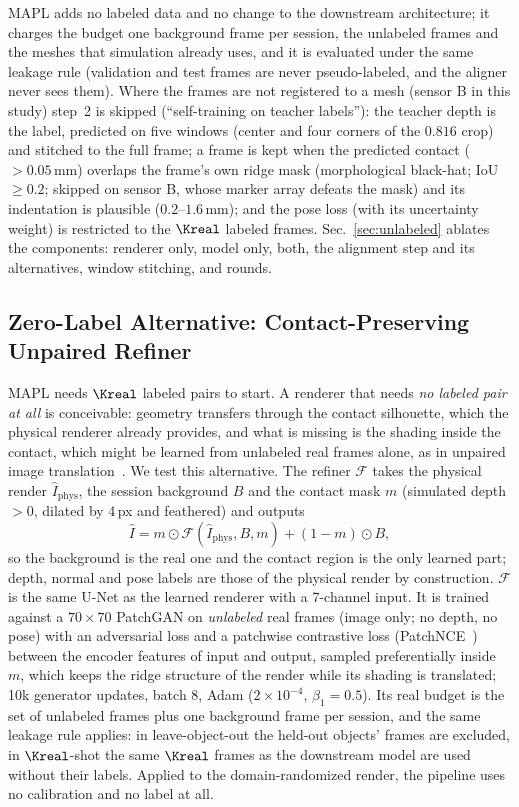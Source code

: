 MAPL adds no labeled data and no change to the downstream architecture; it charges the budget one background frame per session, the unlabeled frames and the meshes that simulation already uses, and it is evaluated under the same leakage rule (validation and test frames are never pseudo-labeled, and the aligner never sees them). Where the frames are not registered to a mesh (sensor B in this study) step~2 is skipped (``self-training on teacher labels''): the teacher depth is the label, predicted on five windows (center and four corners of the $0.816$ crop) and stitched to the full frame; a frame is kept when the predicted contact ($>0.05\,$mm) overlaps the frame's own ridge mask (morphological black-hat; IoU $\ge0.2$; skipped on sensor B, whose marker array defeats the mask) and its indentation is plausible ($0.2$--$1.6\,$mm); and the pose loss (with its uncertainty weight) is restricted to the $\Kreal$ labeled frames. Sec.~\ref{sec:unlabeled} ablates the components: renderer only, model only, both, the alignment step and its alternatives, window stitching, and rounds.

\subsection{Zero-Label Alternative: Contact-Preserving Unpaired Refiner}
\label{sec:refiner}
MAPL needs $\Kreal$ labeled pairs to start. A renderer that needs \emph{no labeled pair at all} is conceivable: geometry transfers through the contact silhouette, which the physical renderer already provides, and what is missing is the shading inside the contact, which might be learned from unlabeled real frames alone, as in unpaired image translation~\cite{shrivastava2017simgan,park2020cut,chen2022cyclegan}. We test this alternative. The refiner $\mathcal{F}$ takes the physical render $\hat I_{\mathrm{phys}}$, the session background $B$ and the contact mask $m$ (simulated depth $>0$, dilated by 4\,px and feathered) and outputs
\begin{equation}
    \hat I = m \odot \mathcal{F}(\hat I_{\mathrm{phys}}, B, m) + (1-m) \odot B ,
\end{equation}
so the background is the real one and the contact region is the only learned part; depth, normal and pose labels are those of the physical render by construction. $\mathcal{F}$ is the same U-Net as the learned renderer with a 7-channel input. It is trained against a $70\times70$ PatchGAN on \emph{unlabeled} real frames (image only; no depth, no pose) with an adversarial loss and a patchwise contrastive loss (PatchNCE~\cite{park2020cut}) between the encoder features of input and output, sampled preferentially inside $m$, which keeps the ridge structure of the render while its shading is translated; 10k generator updates, batch 8, Adam ($2\times10^{-4}$, $\beta_1=0.5$). Its real budget is the set of unlabeled frames plus one background frame per session, and the same leakage rule applies: in leave-object-out the held-out objects' frames are excluded, in $\Kreal$-shot the same $\Kreal$ frames as the downstream model are used without their labels. Applied to the domain-randomized render, the pipeline uses no calibration and no label at all.

